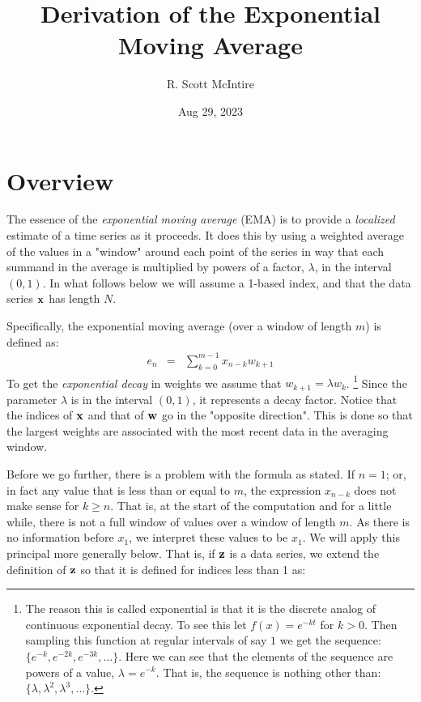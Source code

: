 \documentclass{article}
\title{Derivation of the Exponential Moving Average}
\author{R. Scott McIntire}
\date{Aug 29, 2023}
\begin{document}
\maketitle


\section{Overview}

The essence of the {\em exponential moving average\/} (EMA) is to provide 
a {\em localized\/} estimate of a time series as it proceeds. It does 
this by using a weighted average of the values in a "window" around each point 
of the series in way that each summand in 
the average is multiplied by powers of a factor, $\lambda$,
in the interval $(0,1)$.
In what follows below we will assume a 1-based index, and that 
the data series ${\bf x}$ has length $N$.

Specifically, the exponential moving average (over a window of length $m$) 
is defined as:
\begin{eqnarray}
    e_n & = & \sum_{k=0}^{m-1} x_{n-k} w_{k+1} \label{ema_def}
\end{eqnarray}
To get the {\em exponential decay\/} in weights we assume that $w_{k+1} = \lambda w_k$.%
\footnote{The reason this is called exponential is that it is the discrete
analog of continuous exponential decay. To see this let $f(x) = e^{-kt}$ 
for $k > 0$. Then sampling this function at regular intervals of say $1$ 
we get the sequence: $\{ e^{-k}, e^{-2k}, e^{-3k}, \ldots \}$.
Here we can see that the elements of the sequence are powers of a value, $\lambda = e^{-k}$.
That is, the sequence is nothing other than: $\{\lambda, \lambda^2, \lambda^3, \ldots \}$.}
Since the parameter $\lambda$ is in the interval $(0,1)$, it represents a decay factor. 
Notice that the indices of ${\bf x}$ and that of ${\bf w}$ go in the "opposite direction".
This is done so that the largest weights are associated with the most recent data
in the averaging window.

Before we go further, there is a problem with the formula as stated.
If $n = 1$; or, in fact any value that is less than or equal to $m$,
the expression $x_{n-k}$ does not make sense for $k \ge n$. That is, at the 
start of the computation and for a little while, there is not a full window
of values over a window of length $m$. As there is no information before $x_1$,
we interpret these values to be $x_1$. 
We will apply this principal more generally below. 
That is, if ${\bf z}$ is a data series,
we extend the definition of ${\bf z}$ so that it is defined for
indices less than 1 as:
\end{document}
